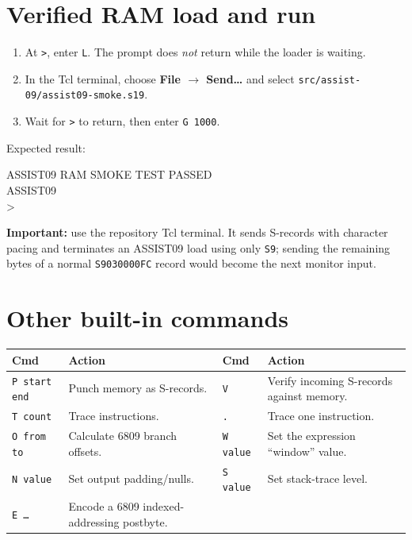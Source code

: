 \documentclass[9pt,a4paper]{article}
\newcommand{\cmd}[1]{\texttt{#1}}
\begin{document}
\section*{Verified RAM load and run}

\begin{enumerate}[leftmargin=6mm,itemsep=1pt,topsep=1pt]
  \item At \cmd{>}, enter \cmd{L}.  The prompt does \emph{not} return while the loader is waiting.
  \item In the Tcl terminal, choose \textbf{File $\rightarrow$ Send\ldots} and select \cmd{src/assist-09/assist09-smoke.s19}.
  \item Wait for \cmd{>} to return, then enter \cmd{G 1000}.
\end{enumerate}

Expected result:

\begin{center}
\begin{minipage}{0.72\linewidth}
\ttfamily
ASSIST09 RAM SMOKE TEST PASSED\\
ASSIST09\\
>
\end{minipage}
\end{center}

\textbf{Important:} use the repository Tcl terminal.  It sends S-records with character pacing and terminates an ASSIST09 load using only \cmd{S9}; sending the remaining bytes of a normal \cmd{S9030000FC} record would become the next monitor input.

\section*{Other built-in commands}

\begin{tabularx}{\linewidth}{@{}>{\ttfamily}p{28mm}X@{\qquad}>{\ttfamily}p{19mm}X@{}}
\toprule
\normalfont\textbf{Cmd} & \textbf{Action} & \normalfont\textbf{Cmd} & \textbf{Action} \\
\midrule
\cmd{P start end} & Punch memory as S-records. & \cmd{V} & Verify incoming S-records against memory. \\
\cmd{T count} & Trace instructions. & \cmd{.} & Trace one instruction. \\
\cmd{O from to} & Calculate 6809 branch offsets. & \cmd{W value} & Set the expression ``window'' value. \\
\cmd{N value} & Set output padding/nulls. & \cmd{S value} & Set stack-trace level. \\
\cmd{E \ldots} & Encode a 6809 indexed-addressing postbyte. & & \\
\bottomrule
\end{tabularx}
\end{document}
